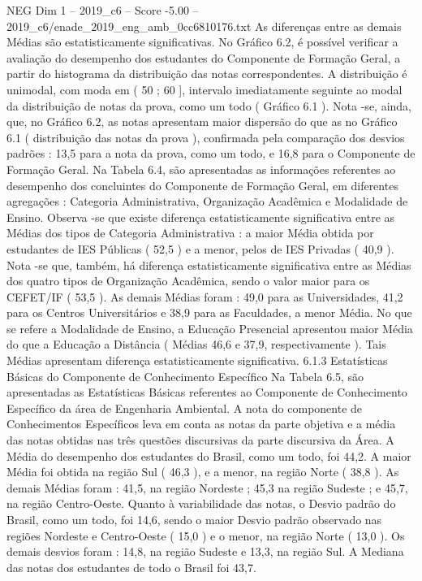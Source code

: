\begin{textsample}{NEG Dim 1 – 2019\_c6 – Score -5.00 – 2019\_c6/enade\_2019\_eng\_amb\_0cc6810176.txt}
As diferenças entre as demais Médias são estatisticamente significativas.
No Gráfico 6.2, é possível verificar a avaliação do desempenho dos estudantes do Componente de Formação Geral, a partir do histograma da distribuição das notas correspondentes.
A distribuição é unimodal, com moda em ( 50 ; 60 ], intervalo imediatamente seguinte ao modal da distribuição de notas da prova, como um todo ( Gráfico 6.1 ).
Nota -se, ainda, que, no Gráfico 6.2, as notas apresentam maior dispersão do que as no Gráfico 6.1 ( distribuição das notas da prova ), confirmada pela comparação dos desvios padrões : 13,5 para a nota da prova, como um todo, e 16,8 para o Componente de Formação Geral.
Na Tabela 6.4, são apresentadas as informações referentes ao desempenho dos concluintes do Componente de Formação Geral, em diferentes agregações : Categoria Administrativa, Organização Acadêmica e Modalidade de Ensino.
Observa -se que existe diferença estatisticamente significativa entre as Médias dos tipos de Categoria Administrativa : a maior Média obtida por estudantes de IES Públicas ( 52,5 ) e a menor, pelos de IES Privadas ( 40,9 ).
Nota -se que, também, há diferença estatisticamente significativa entre as Médias dos quatro tipos de Organização Acadêmica, sendo o valor maior para os CEFET/IF ( 53,5 ).
As demais Médias foram : 49,0 para as Universidades, 41,2 para os Centros Universitários e 38,9 para as Faculdades, a menor Média.
No que se refere a Modalidade de Ensino, a Educação Presencial apresentou maior Média do que a Educação a Distância ( Médias 46,6 e 37,9, respectivamente ).
Tais Médias apresentam diferença estatisticamente significativa. 6.1.3 Estatísticas Básicas do Componente de Conhecimento Específico Na Tabela 6.5, são apresentadas as Estatísticas Básicas referentes ao Componente de Conhecimento Específico da área de Engenharia Ambiental.
A nota do componente de Conhecimentos Específicos leva em conta as notas da parte objetiva e a média das notas obtidas nas três questões discursivas da parte discursiva da Área.
A Média do desempenho dos estudantes do Brasil, como um todo, foi 44,2.
A maior Média foi obtida na região Sul ( 46,3 ), e a menor, na região Norte ( 38,8 ).
As demais Médias foram : 41,5, na região Nordeste ; 45,3 na região Sudeste ; e 45,7, na região Centro-Oeste.
Quanto à variabilidade das notas, o Desvio padrão do Brasil, como um todo, foi 14,6, sendo o maior Desvio padrão observado nas regiões Nordeste e Centro-Oeste ( 15,0 ) e o menor, na região Norte ( 13,0 ).
Os demais desvios foram : 14,8, na região Sudeste e 13,3, na região Sul.
A Mediana das notas dos estudantes de todo o Brasil foi 43,7.

\end{textsample}
